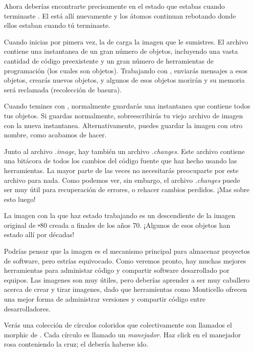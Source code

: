 \documentclass[a4paper,10pt,twoside]{book}
\begin{document}

Ahora deber\'ias encontrarte precisamente en el estado que estabas cuando terminaste \pharo. El \bam est\'a all\'i nuevamente y los \'atomos continuan rebotando donde ellos estaban cuando t\'u terminaste.

Cuando inicias \pharo por pimera vez, la  de \pharo carga la imagen que le sumistres. El archivo contiene una instantanea de un gran n\'umero de objetos, incluyendo una vasta cantidad de c\'odigo preexistente y un gran n\'umero de herramientas de programaci\'on (los cuales son objetos). Trabajando con \pharo, enviar\'as mensajes a esos objetos, crear\'as nuevos objetos, y algunos de esos objetos morir\'an y su memoria ser\'a reclamada (\ie recolecci\'on de basura).

Cuando temines con \pharo, normalmente guardar\'as una instantanea que contiene todos tus objetos. Si guardas normalmente, sobreescribir\'as tu viejo archivo de imagen con la nueva instantanea. Alternativamente, puedes guardar la imagen con otro nombre, como acabamos de hacer.

Junto al archivo \emph{.image}, hay tambi\'en un archivo \emph{.changes}.
Este archivo contiene una bit\'acora de todos los cambios del c\'odigo fuente que haz hecho usando las herramientas.
La mayor parte de las veces no necesitar\'as preocuparte por este archivo para nada.
Como podemos ver, sin embargo, el archivo \emph{.changes} puede ser muy \'util para recuperaci\'on de errores, o rehacer cambios perdidos.
¡Mas sobre esto luego!

La imagen con la que haz estado trabajando es un descendiente de la imagen original de \st-80 creada a finales de los a\~nos 70.
¡Algunos de esos objetos han estado all\'i por d\'ecadas!

Podr\'ias pensar que la imagen es el mecanismo principal para almacenar proyectos de software, pero estr\'ias equivocado.
Como veremos pronto, hay muchas mejores herramientas para administar c\'odigo y compartir software desarrollado por equipos.
Las imagenes son muy \'utiles, pero deber\'ias aprender a ser muy caballero acerca de crear y tirar imagenes, dado que herramientas como Monticello ofrecen una mejor forma de administrar versiones y compartir c\'odigo entre desarrolladores.

Ver\'as una colecci\'on de c\'irculos coloridos que colectivamente son llamados el morphic  de \bam.
Cada c\'irculo es llamado un \emph{manejador}.
Haz click en el manejador rosa conteniendo la cruz; el \bam deber\'ia haberse ido. 
\end{document}
